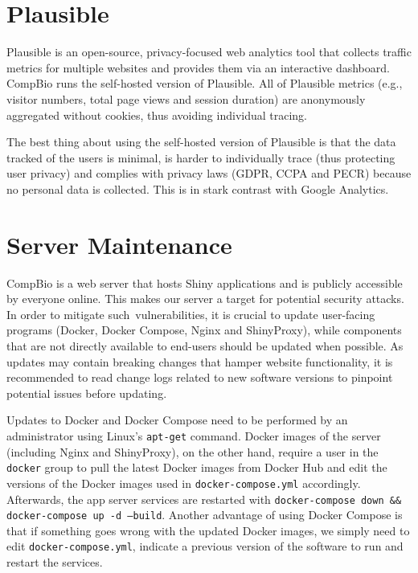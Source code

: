 \section{Plausible}

Plausible is an open-source, privacy-focused web analytics tool that collects traffic metrics for multiple websites and provides them via an interactive dashboard. CompBio runs the self-hosted version of Plausible. All of Plausible metrics (e.g., visitor numbers, total page views and session duration) are anonymously aggregated without cookies, thus avoiding individual tracing.

The best thing about using the self-hosted version of Plausible is that the data tracked of the users is minimal, is harder to individually trace (thus protecting user privacy) and complies with privacy laws (GDPR, CCPA and PECR) because no personal data is collected. This is in stark contrast with Google Analytics.

\section{Server Maintenance}


CompBio is a web server that hosts Shiny applications and is publicly accessible by everyone online. This makes our server a target for potential security attacks. In order to mitigate such vulnerabilities, it is crucial to update user-facing programs (Docker, Docker Compose, Nginx and ShinyProxy), while components that are not directly available to end-users should be updated when possible. As updates may contain breaking changes that hamper website functionality, it is recommended to read change logs related to new software versions to pinpoint potential issues before updating.


Updates to Docker and Docker Compose need to be performed by an administrator using Linux's \texttt{apt-get} command. Docker images of the server (including Nginx and ShinyProxy), on the other hand, require a user in the \texttt{docker} group to pull the latest Docker images from Docker Hub and edit the versions of the Docker images used in \texttt{docker-compose.yml} accordingly. Afterwards, the app server services are restarted with \texttt{docker-compose down \&\& docker-compose up -d --build}. Another advantage of using Docker Compose is that if something goes wrong with the updated Docker images, we simply need to edit \texttt{docker-compose.yml}, indicate a previous version of the software to run and restart the services.

